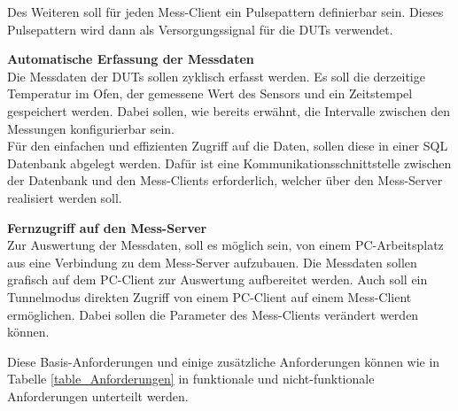 Des Weiteren soll für jeden Mess-Client ein Pulsepattern definierbar sein. Dieses Pulsepattern wird dann als Versorgungssignal für die \acp{DUT} verwendet.

\textbf{Automatische Erfassung der Messdaten}\\
Die Messdaten der \acp{DUT} sollen zyklisch erfasst werden. Es soll die derzeitige Temperatur im Ofen, der gemessene Wert des Sensors und ein Zeitstempel gespeichert werden. Dabei sollen, wie bereits erwähnt, die Intervalle zwischen den Messungen konfigurierbar sein.\\
Für den einfachen und effizienten Zugriff auf die Daten, sollen diese in einer \ac{SQL} Datenbank abgelegt werden. Dafür ist eine Kommunikationsschnittstelle zwischen der Datenbank und den Mess-Clients erforderlich, welcher über den Mess-Server realisiert werden soll.

\textbf{Fernzugriff auf den Mess-Server}\\
Zur Auswertung der Messdaten, soll es möglich sein, von einem PC-Arbeitsplatz aus eine Verbindung zu dem Mess-Server aufzubauen. Die Messdaten sollen grafisch auf dem PC-Client zur Auswertung aufbereitet werden.
Auch soll ein Tunnelmodus direkten Zugriff von einem PC-Client auf einem Mess-Client ermöglichen. Dabei sollen die Parameter des Mess-Clients verändert werden können.

Diese Basis-Anforderungen und einige zusätzliche Anforderungen können wie in Tabelle \ref{table_Anforderungen} in funktionale und nicht-funktionale Anforderungen unterteilt werden.


